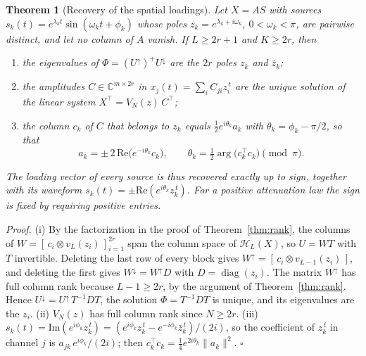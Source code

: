 \documentclass{article}
\newtheorem{theorem}{\bf Theorem}
\begin{document}
\begin{theorem}[Recovery of the spatial loadings] \label{thm:loadings}
Let $X = AS$ with sources $s_k(t) = e^{\lambda_k t} \sin(\omega_k t + \phi_k)$ whose poles $z_k = e^{\lambda_k + i\omega_k}$, $0 < \omega_k < \pi$, are pairwise distinct, and let no column of $A$ vanish. If $L \ge 2r + 1$ and $K \ge 2r$, then

\begin{enumerate}
\renewcommand{\labelenumi}{(\roman{enumi})}
\item
  the eigenvalues of $\Phi = (U^{\uparrow})^{+} U^{\downarrow}$ are the $2r$ poles $z_k$ and $\bar{z}_k$;
\item
  the amplitudes $C \in \mathbb{C}^{m \times 2r}$ in $x_j(t) = \sum_i C_{ji} z_i^{\,t}$ are the unique solution of the linear system $X^{\top} = V_N(z)\, C^{\top}$;
\item
  the column $c_k$ of $C$ that belongs to $z_k$ equals $\tfrac{1}{2} e^{i\theta_k} a_k$ with $\theta_k = \phi_k - \pi/2$, so that 
\begin{equation} \label{eq:loading}
a_k = \pm\, 2\, \mathrm{Re}\bigl(e^{-i\theta_k} c_k\bigr), \qquad \theta_k = \tfrac{1}{2} \arg\bigl(c_k^{\top} c_k\bigr) \pmod{\pi}.
\end{equation}
\end{enumerate}

The loading vector of every source is thus recovered exactly up to sign, together with its waveform $s_k(t) = \pm\mathrm{Re}(e^{i\theta_k} z_k^{\,t})$. For a positive attenuation law the sign is fixed by requiring positive entries.
\end{theorem}

\textit{Proof.} (i) By the factorization in the proof of Theorem~\ref{thm:rank}, the columns of $W = [\, c_i \otimes v_L(z_i) \,]_{i=1}^{2r}$ span the column space of $\mathcal{H}_L(X)$, so $U = WT$ with $T$ invertible. Deleting the last row of every block gives $W^{\uparrow} = [\, c_i \otimes v_{L-1}(z_i) \,]$, and deleting the first gives $W^{\downarrow} = W^{\uparrow} D$ with $D = \operatorname{diag}(z_i)$. The matrix $W^{\uparrow}$ has full column rank because $L - 1 \ge 2r$, by the argument of Theorem~\ref{thm:rank}. Hence $U^{\downarrow} = U^{\uparrow}\, T^{-1} D T$, the solution $\Phi = T^{-1} D T$ is unique, and its eigenvalues are the $z_i$. (ii) $V_N(z)$ has full column rank since $N \ge 2r$. (iii) $s_k(t) = \mathrm{Im}(e^{i\phi_k} z_k^{\,t}) = (e^{i\phi_k} z_k^{\,t} - e^{-i\phi_k} \bar{z}_k^{\,t})/(2i)$, so the coefficient of $z_k^{\,t}$ in channel $j$ is $a_{jk}\, e^{i\phi_k}/(2i)$; then $c_k^{\top} c_k = \tfrac{1}{4} e^{2i\theta_k} \lVert a_k \rVert^2$. $\square$
\end{document}
